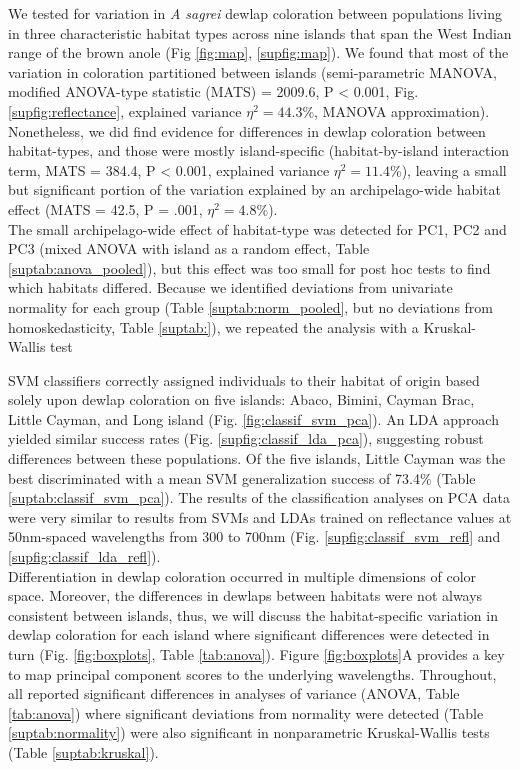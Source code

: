 
We tested for variation in \textit{A sagrei} dewlap coloration between populations living in three characteristic habitat types across nine islands that span the West Indian range of the brown anole (Fig \ref{fig:map}, \ref{supfig:map}). We found that most of the variation in coloration partitioned between islands (semi-parametric MANOVA, modified ANOVA-type statistic (MATS) = 2009.6, P < 0.001, Fig. \ref{supfig:reflectance}, explained variance $\eta^2 = 44.3$\%, MANOVA approximation). Nonetheless, we did find evidence for differences in dewlap coloration between habitat-types, and those were mostly island-specific (habitat-by-island interaction term, MATS = 384.4, P < 0.001, explained variance $\eta^2 = 11.4$\%), leaving a small but significant portion of the variation explained by an archipelago-wide habitat effect (MATS = 42.5, P = .001, $\eta^2 = 4.8$\%).\\

The small archipelago-wide effect of habitat-type was detected for PC1, PC2 and PC3 (mixed ANOVA with island as a random effect, Table \ref{suptab:anova_pooled}), but this effect was too small for post hoc tests to find which habitats differed. Because we identified deviations from univariate normality for each group (Table \ref{suptab:norm_pooled}, but no deviations from homoskedasticity, Table \ref{suptab:}), we repeated the analysis with a Kruskal-Wallis test 

SVM classifiers correctly assigned individuals to their habitat of origin based solely upon dewlap coloration on five islands: Abaco, Bimini, Cayman Brac, Little Cayman, and Long island (Fig. \ref{fig:classif_svm_pca}). An LDA approach yielded similar success rates (Fig. \ref{supfig:classif_lda_pca}), suggesting robust differences between these populations. Of the five islands, Little Cayman was the best discriminated with a mean SVM generalization success of 73.4\% (Table \ref{suptab:classif_svm_pca}). The results of the classification analyses on PCA data were very similar to results from SVMs and LDAs trained on reflectance values at 50nm-spaced wavelengths from 300 to 700nm (Fig. \ref{supfig:classif_svm_refl} and \ref{supfig:classif_lda_refl}).\\

Differentiation in dewlap coloration occurred in multiple dimensions of color space. Moreover, the differences in dewlaps between habitats were not always consistent between islands, thus, we will discuss the habitat-specific variation in dewlap coloration for each island where significant differences were detected in turn (Fig. \ref{fig:boxplots}, Table \ref{tab:anova}). Figure \ref{fig:boxplots}A provides a key to map principal component scores to the underlying wavelengths. Throughout, all reported significant differences in analyses of variance (ANOVA, Table \ref{tab:anova}) where significant deviations from normality were detected (Table \ref{suptab:normality}) were also significant in nonparametric Kruskal-Wallis tests (Table \ref{suptab:kruskal}).\\

